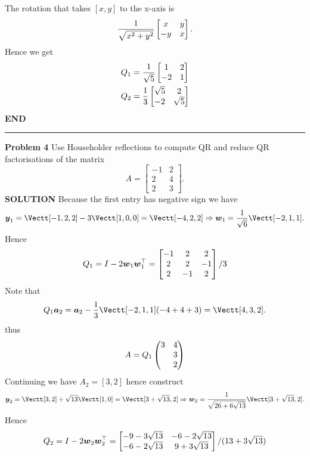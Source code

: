 \documentclass[12pt,a4paper]{article}
\def\a{ {\vc a} }
\def\y{ {\vc y} }
\def\w{ {\vc w} }
\begin{document}
The rotation that takes $[x,y]$ to the x-axis is
\[
{1 \over \sqrt{x^2+y^2}} \begin{bmatrix}
x & y \\
-y & x
\end{bmatrix}.
\]
Hence we get
\begin{align*}
Q_1 &= {1 \over \sqrt{5}} \begin{bmatrix} 1 & 2 \\ -2 & 1 \end{bmatrix} \\
Q_2 &= {1 \over 3} \begin{bmatrix} \sqrt{5} & 2 \\ -2 & \sqrt{5} \end{bmatrix}
\end{align*}
\textbf{END}

\rule{\textwidth}{1pt}
\textbf{Problem 4} Use Householder reflections to compute QR and reduce QR factorisations of the matrix
\[
A = \begin{bmatrix} -1 & 2 \\ 
2 & 4 \\ 
2 & 3 \end{bmatrix}.
\]
\textbf{SOLUTION} Because the first entry has negative sign we have
\[
\ensuremath{\bm{\y}}_1 = \Vectt[-1,2,2] - 3\Vectt[1,0,0] = \Vectt[-4,2,2] \ensuremath{\Rightarrow} \ensuremath{\bm{\w}}_1 = {1 \over \sqrt{6}} \Vectt[-2,1,1].
\]
Hence
\[
Q_1 = I - 2\ensuremath{\bm{\w}}_1 \ensuremath{\bm{\w}}_1^\ensuremath{\top} = \begin{bmatrix} -1 & 2 & 2 \\ 2 & 2 & -1 \\ 2 & -1 & 2 \end{bmatrix}/3
\]
Note that
\[
Q_1 \ensuremath{\bm{\a}}_2 = \ensuremath{\bm{\a}}_2 - {1 \over 3}  \Vectt[-2,1,1] (-4 + 4 + 3) = \Vectt[4, 3, 2].
\]
thus
\[
 A = Q_1\begin{pmatrix}3 & 4 \\ & 3 \\ & 2\end{pmatrix}
\]
Continuing we have $A_2 = [3,2]$ hence construct
\[
\ensuremath{\bm{\y}}_2 = \Vectt[3,2] + \sqrt{13}\Vectt[1,0] = \Vectt[3+\sqrt{13},2] \ensuremath{\Rightarrow} \ensuremath{\bm{\w}}_2 = {1 \over \sqrt{26+6\sqrt{13}}} \Vectt[3+\sqrt{13},2].
\]
Hence
\[
Q_2 = I - 2 \ensuremath{\bm{\w}}_2 \ensuremath{\bm{\w}}_2^\ensuremath{\top} = \begin{bmatrix} -9-3\sqrt{13} & -6-2\sqrt{13} \\ 
                                         -6-2\sqrt{13} & 9+3\sqrt{13} \end{bmatrix}/(13+3\sqrt{13})
\]
\end{document}
